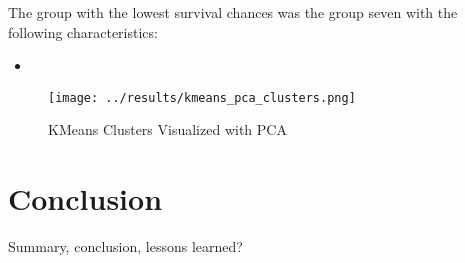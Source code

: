 \documentclass[a4paper,12pt]{article}
\begin{document}
The group with the lowest survival chances was the group seven with the following characteristics:

\begin{itemize}
  \item
\end{itemize}

\begin{wrapfigure}{r}{0.5\linewidth}
  \centering
  \texttt{[image: ../results/kmeans\_pca\_clusters.png]}
  \caption{KMeans Clusters Visualized with PCA}
\end{wrapfigure}

\section{Conclusion}
Summary, conclusion, lessons learned?
\end{document}
